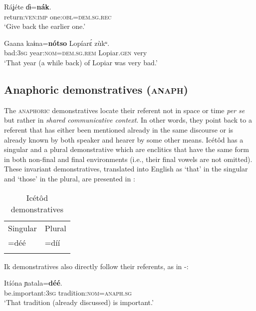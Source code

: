 \ea\label{ex:dem:3}
\gll Ráʝéte     ɗɨ=\textbf{nák\ᵃ}.\\
return:\textsc{ven:imp}   one:\textsc{obl=dem.sg.rec}\\
\glt ‘Give back the earlier one.’ 
\z




\ea\label{ex:dem:4}
\gll Gaana   kaɨna=\textbf{nótso}       Lopíar{\Í}\'{ɛ}     zùkᵘ. \\
bad:\textsc{3sg}   year:\textsc{nom}=\textsc{dem.sg.rem}   Lopiar.\textsc{gen} very    \\
\glt `That year (a while back) of Lopiar was very bad.’
\z  





\subsection{Anaphoric demonstratives (\textsc{anaph})}\label{sec:6.4}


The \textsc{anaphoric} demonstratives locate their referent not in space or time \textit{per se} but rather in \textit{shared communicative context}. In other words, they point back to a referent that has either been mentioned already in the same discourse or is already known by both speaker and hearer by some other means. Icétôd has a singular and a plural  demonstrative which are enclitics that have the same form in both non-final and final environments (i.e., their final vowels are not omitted). These invariant  demonstratives, translated into English as ‘that’ in the singular and ‘those’ in the plural, are presented in :


\begin{table}
\caption{Icétôd  demonstratives}
\label{tab:dem:anaph}
\begin{tabularx}{\textwidth}{XX}
\lsptoprule
Singular & Plural\\
\tablevspace
=déé & =díí\\
\lspbottomrule
\end{tabularx}
\end{table}

Ik  demonstratives also directly follow their referents, as in -:




\ea\label{ex:dem:5}
\gll Itíóna     ɲatala=\textbf{déé}. \\
be.important:\textsc{3sg}   tradition:\textsc{nom}=\textsc{anaph.sg}    \\
\glt ‘That tradition (already discussed) is important.’ 
\z




